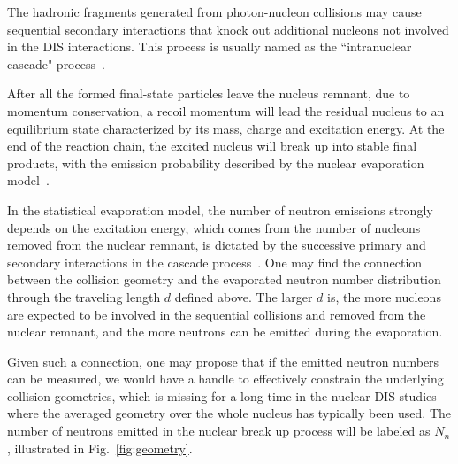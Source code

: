 The hadronic fragments generated from photon-nucleon collisions may cause
sequential secondary interactions that knock out additional nucleons
not involved in the DIS interactions. This process is usually named as the
``intranuclear cascade" process~\cite{Bertini:1963zzc}.

After all the formed final-state particles leave the nucleus remnant, due to
momentum conservation, a recoil momentum will lead the residual nucleus to an
equilibrium state characterized by its mass, charge and excitation energy. At
the end of the reaction chain, the excited nucleus will break up into stable
final products, with the emission probability described by the nuclear
evaporation model~\cite{Weisskopf:1937zz}.

In the statistical evaporation model, the number of neutron emissions strongly
depends on the excitation energy, which comes from the number of nucleons removed from
the nuclear remnant, is dictated by the successive primary and secondary
interactions in the cascade process~\cite{Ferrari:1995cq}. One may find the
connection between the collision geometry and the evaporated neutron number
distribution through the traveling length $d$ defined above. The larger $d$
is, the more nucleons are expected to be involved in the sequential collisions
and removed from the nuclear remnant, and the more neutrons can be emitted during
the evaporation.


Given such a connection, one may propose that if the emitted
neutron numbers can be measured, we would have a handle to effectively
constrain the underlying collision geometries, which is missing for a long time
in the nuclear DIS studies where the averaged geometry over the whole nucleus
has typically been used. The number of neutrons emitted in the nuclear
break up process will be labeled as $N_{n}$, illustrated in
Fig.~\ref{fig:geometry}.

